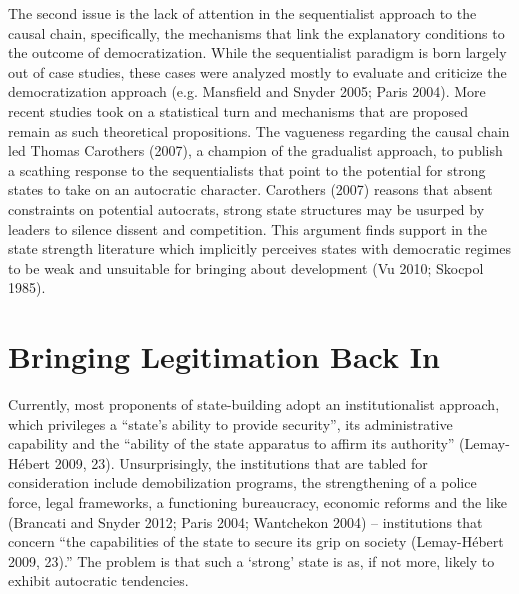\documentclass [11pt]{article}
\begin{document}
The second issue is the lack of attention in the sequentialist approach to the causal chain, specifically, the mechanisms that link the explanatory conditions to the outcome of democratization. While the sequentialist paradigm is born largely out of case studies, these cases were analyzed mostly to evaluate and criticize the democratization approach (e.g. Mansfield and Snyder 2005; Paris 2004). More recent studies took on a statistical turn and mechanisms that are proposed remain as such theoretical propositions. The vagueness regarding the causal chain led Thomas Carothers (2007), a champion of the gradualist approach, to publish a scathing response to the sequentialists that point to the potential for strong states to take on an autocratic character. Carothers (2007) reasons that absent constraints on potential autocrats, strong state structures may be usurped by leaders to silence dissent and competition. This argument finds support in the state strength literature which implicitly perceives states with democratic regimes to be weak and unsuitable for bringing about development (Vu 2010; Skocpol 1985).


\section*{Bringing Legitimation Back In}

Currently, most proponents of state-building adopt an institutionalist approach, which privileges a ``state's ability to provide security'', its administrative capability and the ``ability of the state apparatus to affirm its authority'' (Lemay-Hébert 2009, 23). Unsurprisingly, the institutions that are tabled for consideration include demobilization programs, the strengthening of a police force, legal frameworks, a functioning bureaucracy, economic reforms and the like (Brancati and Snyder 2012; Paris 2004; Wantchekon 2004) -- institutions that concern ``the capabilities of the state to secure its grip on society (Lemay-Hébert 2009, 23).'' The problem is that such a `strong' state is as, if not more, likely to exhibit autocratic tendencies. 
\end{document}
